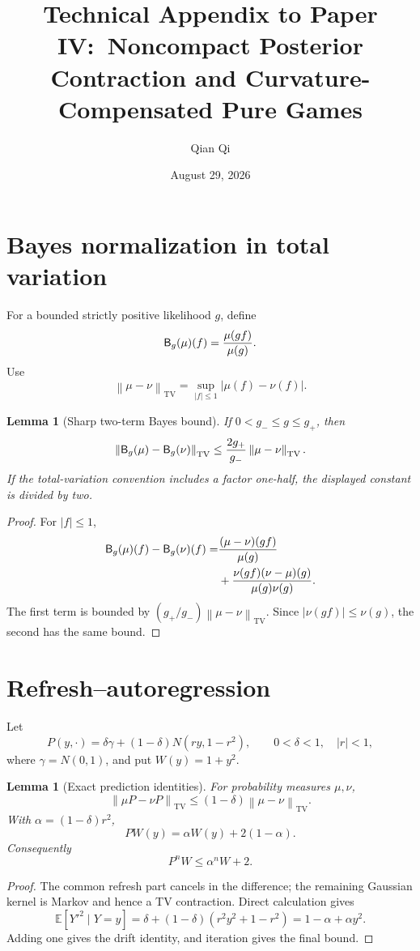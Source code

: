 \documentclass[11pt,reqno]{amsart}
\title{Technical Appendix to Paper IV:\ Noncompact Posterior Contraction and Curvature-Compensated Pure Games}
\author{Qian Qi}
\date{August 29, 2026}
\newtheorem{lemma}[theorem]{Lemma}
\theoremstyle{definition}
\newcommand{\E}{\mathbb E}
\newcommand{\TV}{\mathrm{TV}}
\newcommand{\norm}[1]{\left\lVert#1\right\rVert}
\newcommand{\abs}[1]{\left\lvert#1\right\rvert}
\begin{document}
\maketitle

\section{Bayes normalization in total variation}

For a bounded strictly positive likelihood $g$, define
\[
 \mathsf B_g(\mu)(f)={\mu(gf)\over\mu(g)}.
\]
Use
\[
 \norm{\mu-\nu}_{\TV}=\sup_{\abs f\le1}
 \abs{\mu(f)-\nu(f)}.
\]

\begin{lemma}[Sharp two-term Bayes bound]\label{lem:Bayes-bound}
If $0<g_-\le g\le g_+$, then
\[
 \norm{\mathsf B_g(\mu)-\mathsf B_g(\nu)}_{\TV}
 \le {2g_+\over g_-}\norm{\mu-\nu}_{\TV}.
\]
If the total-variation convention includes a factor one-half, the displayed
constant is divided by two.
\end{lemma}

\begin{proof}
For $\abs f\le1$,
\begin{align*}
 \mathsf B_g(\mu)(f)-\mathsf B_g(\nu)(f)
 =&{(\mu-\nu)(gf)\over\mu(g)}\\
 &+{\nu(gf)(\nu-\mu)(g)\over\mu(g)\nu(g)}.
\end{align*}
The first term is bounded by
$(g_+/g_-)\norm{\mu-\nu}_{\TV}$.  Since
$\abs{\nu(gf)}\le\nu(g)$, the second has the same bound.
\end{proof}

\section{Refresh--autoregression}

Let
\[
 P(y,\cdot)=\delta\gamma+(1-\delta)N(ry,1-r^2),
 \qquad0<\delta<1,\quad\abs r<1,
\]
where $\gamma=N(0,1)$, and put $W(y)=1+y^2$.

\begin{lemma}[Exact prediction identities]\label{lem:prediction}
For probability measures $\mu,\nu$,
\[
 \norm{\mu P-\nu P}_{\TV}
 \le(1-\delta)\norm{\mu-\nu}_{\TV}.
\]
With $\alpha=(1-\delta)r^2$,
\[
 PW(y)=\alpha W(y)+2(1-\alpha).
\]
Consequently
\[
 P^nW\le\alpha^nW+2.
\]
\end{lemma}

\begin{proof}
The common refresh part cancels in the difference; the remaining Gaussian
kernel is Markov and hence a TV contraction.  Direct calculation gives
\[
 \E[Y'^2\mid Y=y]
 =\delta+(1-\delta)(r^2y^2+1-r^2)
 =1-\alpha+\alpha y^2.
\]
Adding one gives the drift identity, and iteration gives the final bound.
\end{proof}
\end{document}
